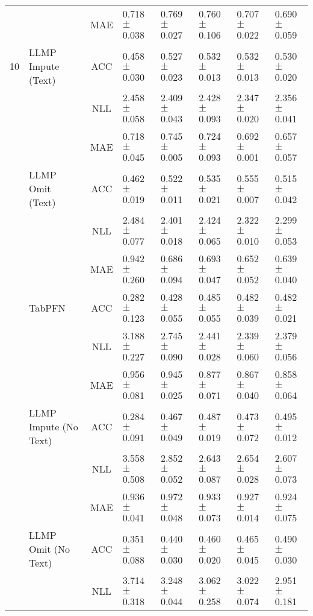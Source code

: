 \begin{table*}[htbp]
\begin{tiny}
\begin{sc}
\begin{adjustbox}{max width=\textwidth}
\begin{tabular}{crclllll}
\cmidrule{2-8}          &       & MAE   & 0.718$\pm$0.038 & 0.769$\pm$0.027 & 0.760$\pm$0.106 & 0.707$\pm$0.022 & 0.690$\pm$0.059 \\
    10    & \multicolumn{1}{l}{LLMP Impute (Text)} & ACC   & 0.458$\pm$0.030 & 0.527$\pm$0.023 & 0.532$\pm$0.013 & 0.532$\pm$0.013 & 0.530$\pm$0.020 \\
          &       & NLL   & 2.458$\pm$0.058 & 2.409$\pm$0.043 & 2.428$\pm$0.093 & 2.347$\pm$0.020 & 2.356$\pm$0.041 \\
\cmidrule{2-8}          &       & MAE   & 0.718$\pm$0.045 & 0.745$\pm$0.005 & 0.724$\pm$0.093 & 0.692$\pm$0.001 & 0.657$\pm$0.057 \\
          & \multicolumn{1}{l}{LLMP Omit (Text)} & ACC   & 0.462$\pm$0.019 & 0.522$\pm$0.011 & 0.535$\pm$0.021 & 0.555$\pm$0.007 & 0.515$\pm$0.042 \\
          &       & NLL   & 2.484$\pm$0.077 & 2.401$\pm$0.018 & 2.424$\pm$0.065 & 2.322$\pm$0.010 & 2.299$\pm$0.053 \\
\cmidrule{2-8}          &       & MAE   & 0.942$\pm$0.260 & 0.686$\pm$0.094 & 0.693$\pm$0.047 & 0.652$\pm$0.052 & 0.639$\pm$0.040 \\
          & \multicolumn{1}{l}{TabPFN} & ACC   & 0.282$\pm$0.123 & 0.428$\pm$0.055 & 0.485$\pm$0.055 & 0.482$\pm$0.039 & 0.482$\pm$0.021 \\
          &       & NLL   & 3.188$\pm$0.227 & 2.745$\pm$0.090 & 2.441$\pm$0.028 & 2.339$\pm$0.060 & 2.379$\pm$0.056 \\
    \midrule
          &       & MAE   & 0.956$\pm$0.081 & 0.945$\pm$0.025 & 0.877$\pm$0.071 & 0.867$\pm$0.040 & 0.858$\pm$0.064 \\
          & \multicolumn{1}{l}{LLMP Impute (No Text)} & ACC   & 0.284$\pm$0.091 & 0.467$\pm$0.049 & 0.487$\pm$0.019 & 0.473$\pm$0.072 & 0.495$\pm$0.012 \\
          &       & NLL   & 3.558$\pm$0.508 & 2.852$\pm$0.052 & 2.643$\pm$0.087 & 2.654$\pm$0.028 & 2.607$\pm$0.073 \\
\cmidrule{2-8}          &       & MAE   & 0.936$\pm$0.041 & 0.972$\pm$0.048 & 0.933$\pm$0.073 & 0.927$\pm$0.014 & 0.924$\pm$0.075 \\
          & \multicolumn{1}{l}{LLMP Omit (No Text)} & ACC   & 0.351$\pm$0.088 & 0.440$\pm$0.030 & 0.460$\pm$0.020 & 0.465$\pm$0.045 & 0.490$\pm$0.030 \\
          &       & NLL   & 3.714$\pm$0.318 & 3.248$\pm$0.044 & 3.062$\pm$0.258 & 3.022$\pm$0.074 & 2.951$\pm$0.181 \\

\end{tabular}
\end{adjustbox}
\end{sc}
\end{tiny}
\end{table*}
